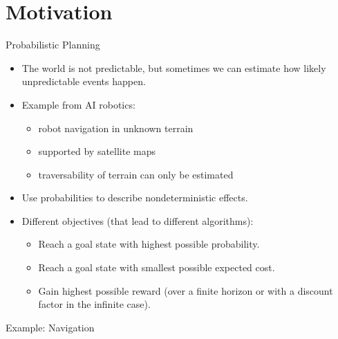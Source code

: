 \documentclass{gkibeamer}
\begin{document}
\section*{Motivation}
\begin{frame}{Probabilistic Planning}
  \begin{itemize}
    \item The world is not predictable, but sometimes we can estimate
    \alert{how likely} unpredictable events happen.
    \item Example from AI robotics:
    \begin{itemize}
      \item robot navigation in unknown terrain
      \item supported by satellite maps
      \item traversability of terrain can only be estimated
    \end{itemize}
    \item Use \alert{probabilities} to describe nondeterministic
    effects.
    \item Different \alert{objectives} (that lead to different
    algorithms):
    \begin{itemize}
      \item Reach a goal state with highest possible probability. 
      \item Reach a goal state with smallest possible \alert{expected
        cost}.
      \item Gain highest possible \alert{reward} (over a finite
      \alert{horizon} or with a \alert{discount factor} in the infinite
      case).
    \end{itemize}
  \end{itemize}
\end{frame}

\begin{frame}{Example: Navigation}
  \begin{center}
  \end{center}
\end{frame}
\end{document}
